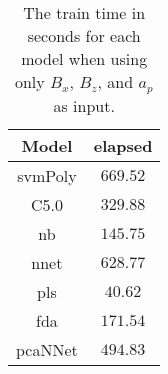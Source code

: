 \begin{table}[!ht]
	\centering
	\begin{tabular}{|c|c|}
		\hline
		Model & elapsed \\ \hline
		svmPoly & $669.52$ \\ \hline
		C5.0 & $329.88$ \\ \hline
		nb & $145.75$ \\ \hline
		nnet & $628.77$ \\ \hline
		pls & $40.62$ \\ \hline
		fda & $171.54$ \\ \hline
		pcaNNet & $494.83$ \\ \hline
	\end{tabular}
	\caption{The train time in seconds for each model when using only $B_{x}$, $B_{z}$, and $a_{p}$ as input.}
	\label{tab:time:xzap:train}
\end{table}
